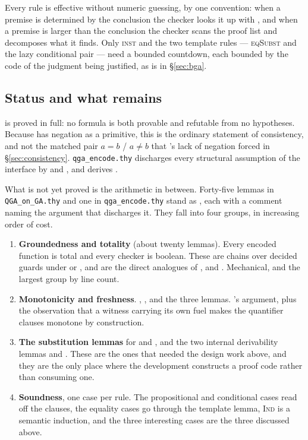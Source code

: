 Every rule is effective without numeric guessing, by one convention: when a
premise is determined by the conclusion the checker looks it up with ,
and when a premise is larger than the conclusion the checker scans the proof
list and decomposes what it finds.  Only \textsc{inst} and the two template
rules --- \textsc{eqSubst} and the lazy conditional pair --- need a bounded
countdown, each bounded by the code of the judgment being justified, as
 is in \S\ref{sec:bga}.

\subsection{Status and what remains}

 is proved in full: no formula is
both provable and refutable from no hypotheses.  Because \QGA{} has negation as
a primitive, this is the ordinary statement of consistency, and not the matched
pair $a = b$ / $a \neq b$ that \BGA's lack of negation forced in
\S\ref{sec:consistency}.  \texttt{qga\_encode.thy} discharges every structural
assumption of the interface by  and , and derives
.

What is not yet proved is the arithmetic in between.  Forty-five lemmas in
\texttt{QGA\_on\_GA.thy} and one in \texttt{qga\_encode.thy} stand as ,
each with a comment naming the argument that discharges it.  They fall into four
groups, in increasing order of cost.

\begin{enumerate}
\item \textbf{Groundedness and totality} (about twenty lemmas).  Every encoded
      function is total and every checker is boolean.  These are
       chains over decided guards under  or
      , and are the direct analogues of ,
       and .  Mechanical, and the
      largest group by line count.
\item \textbf{Monotonicity and freshness}.  , ,
       and the three  lemmas.  \BGA's
       argument, plus the observation that a witness
      carrying its own fuel makes the quantifier clauses monotone by
      construction.
\item \textbf{The substitution lemmas} for  and , and the
      two internal derivability lemmas  and
      .  These are the ones that needed the design work
      above, and they are the only place where the development constructs a
      proof code rather than consuming one.
\item \textbf{Soundness}, one case per rule.  The propositional and conditional
      cases read off the clauses, the equality cases go through the template
      lemma, \textsc{Ind} is a semantic induction, and the three interesting
      cases are the three discussed above.
\end{enumerate}

